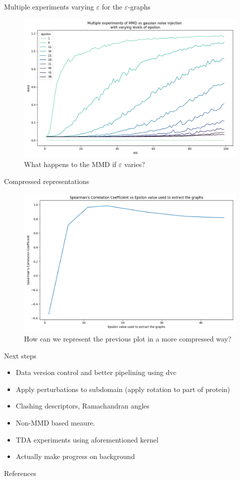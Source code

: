 \documentclass[aspectratio=169, 10pt, dvipsnames, handout]{beamer}
\begin{document}
\begin{frame}[fragile]{Multiple experiments varying $\varepsilon$ for the
    $\varepsilon$-graphs}
  \begin{figure}%
    \centering
    \includegraphics[width=.7\textwidth]{./figures/plot_multiple_experiments.png}
    \caption{What happens to the MMD if $\varepsilon$ varies?}%
  \end{figure}
\end{frame}

\begin{frame}[fragile]{Compressed representations}
  \begin{figure}%
    \centering
    \includegraphics[width=.7\textwidth]{./figures/plot_correlations.png}
    \caption{How can we represent the previous plot in a more compressed way?}%
  \end{figure}
\end{frame}

\begin{frame}[fragile]{Next steps}
  \begin{itemize}
  \item Data version control and better pipelining using dvc
  \item Apply perturbations to subdomain (apply rotation to part of protein)
  \item Clashing descriptors, Ramachandran angles
  \item Non-MMD based meaure. \cite{thompson2022evaluation}
  \item TDA experiments using aforementioned kernel
  \item Actually make progress on background
  \end{itemize}
\end{frame}


\begin{frame}[allowframebreaks]{References}

  
  

\end{frame}
\end{document}
